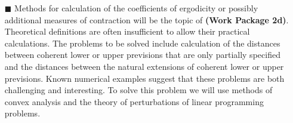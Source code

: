 \documentclass[11pt,dvipsnames,usenames,a4paper]{article}
\begin{document}
\begin{itemize}
\item[\tiny$\blacksquare$]
Methods for calculation of the coefficients of ergodicity or possibly additional measures of contraction will be the topic of {\bf(Work Package 2d)}. Theoretical definitions are often insufficient to allow their practical calculations. The problems to be solved include calculation of the distances between coherent lower or upper previsions that are only partially specified and the distances between the natural extensions of coherent lower or upper previsions. Known numerical examples suggest that these problems are both challenging and interesting. To solve this problem we will use methods of convex analysis and the theory of perturbations of linear programming problems. 








\end{itemize}
\end{document}
